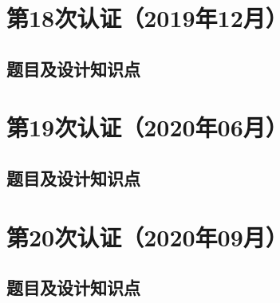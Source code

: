 \documentclass[cn,10pt,math=newtx,citestyle=gb7714-2015,bibstyle=gb7714-2015]{elegantbook}
\begin{document}






\chapter{第18次认证（2019年12月）}

\section{题目及设计知识点}











\chapter{第19次认证（2020年06月）}

\section{题目及设计知识点}











\chapter{第20次认证（2020年09月）}

\section{题目及设计知识点}








\end{document}
